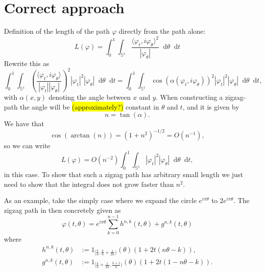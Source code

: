 \documentclass[a4,danish]{article}
\theoremstyle{break}
\theoremstyle{definition}
\theoremstyle{Break}
\renewcommand{\S}{\mathbb{S}}
\renewcommand{\phi}{\varphi}
\newcommand*\diff{\mathop{}\!\mathrm{d}}
\begin{document}
\section{Correct approach}
\label{sec:correct-approach}

Definition of the length of the path $\phi$ directly from the path alone:
\begin{equation*}
  L(\phi) = \int_{0}^{1} \int_{\S^{1}}
  \frac{\langle\phi_{t},i \phi_{\theta}\rangle^2}{|\phi_{\theta}|}  \diff \theta \diff t
\end{equation*}
Rewrite this as
\begin{equation*}
  \int_{0}^{1} \int_{\S^{1}}
  \left(
    \frac{\langle\phi_{t},i
      \phi_{\theta}\rangle}{|\phi_{t}||\phi_{\theta}|}
  \right)^2
  |\phi_t|^2   |\phi_{\theta}|
  \diff \theta \diff t
  =
  \int_{0}^{1} \int_{\S^{1}}
  \cos(\alpha(\phi_t, i\phi_{\theta}))^2
  |\phi_t|^2   |\phi_{\theta}|
  \diff \theta \diff t,
\end{equation*}
with $\alpha(x,y)$ denoting the angle between $x$ and $y$. When
constructing a zigzag-path the angle will be \hl{(approximately?)}
constant in $\theta$ and $t$,
and it is given by
\begin{equation*}
  n = \tan(\alpha).
\end{equation*}
We have that
\begin{equation*}
  \cos(\arctan(n)) = (1+n^2)^{-1/2}
  = O(n^{-1}),
\end{equation*}
so we can write
\begin{equation*}
  L(\phi) = O(n^{-2})
  \int_{0}^{1} \int_{\S^{1}}
  |\phi_t|^2   |\phi_{\theta}|
  \diff \theta \diff t,
\end{equation*}
in this case. To show that such a zigzag path has arbitrary
small length we just need to show that the integral does not grow
faster than $n^2$.

As an example, take the simply case where we expand the circle $e^{i\pi\theta}$ to
$2e^{i\pi\theta}$. The zigzag path in then concretely given as
\begin{equation*}
  \phi(t,\theta) = e^{i\pi\theta}
    \sum_{k=0}^{n-1}
    h^{n,k}(t,\theta) + g^{n,k}(t,\theta)
\end{equation*}
where
\begin{equation*}
  \begin{aligned}
    h^{n,k}(t,\theta) & := 1_{[\frac{k}{n},\frac{k}{n} +
      \frac{1}{2n})}(\theta) \left( 1+2t(n\theta-k) \right), \\
    g^{n,k}(t,\theta) & := 1_{[\frac{k}{n} + \frac{1}{2n},\frac{k+1}{n})}(\theta)
    \left( 1+2t(1-n\theta-k) \right).
  \end{aligned}
\end{equation*}
\end{document}
